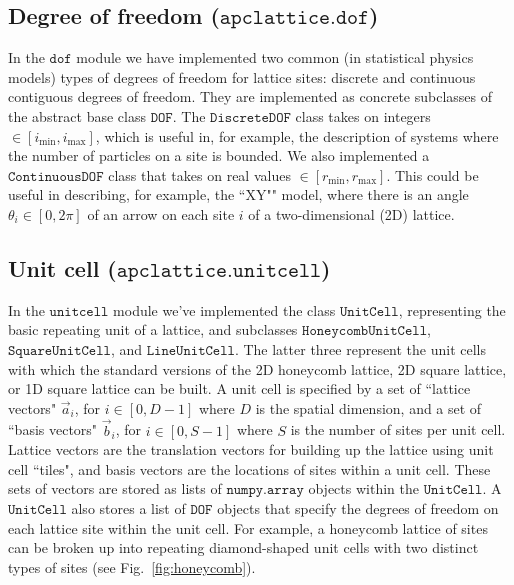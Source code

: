 \documentclass{article}
\begin{document}
\subsection{Degree of freedom ($\texttt{apclattice.dof}$)}
In the $\texttt{dof}$ module we have implemented two common (in statistical physics models) types of degrees of freedom for lattice sites: discrete and continuous contiguous degrees of freedom. They are implemented as concrete subclasses of the abstract base class $\texttt{DOF}$. The $\texttt{DiscreteDOF}$ class takes on integers $\in [i_\mathrm{min}, i_\mathrm{max}]$, which is useful in, for example, the description of systems where the number of particles on a site is bounded. We also implemented a $\texttt{ContinuousDOF}$ class that takes on real values $\in [r_\mathrm{min}, r_\mathrm{max}]$. This could be useful in describing, for example, the ``XY"" model, where there is an angle $\theta_i \in [0, 2 \pi]$ of an arrow on each site $i$ of a two-dimensional (2D) lattice.

\subsection{Unit cell ($\texttt{apclattice.unitcell}$)}
In the $\texttt{unitcell}$ module we've implemented the class $\texttt{UnitCell}$, representing the basic repeating unit of a lattice, and subclasses $\texttt{HoneycombUnitCell}$, $\texttt{SquareUnitCell}$, and $\texttt{LineUnitCell}$. The latter three represent the unit cells with which the standard versions of the 2D honeycomb lattice, 2D square lattice, or 1D square lattice can be built. A unit cell is specified by a set of ``lattice vectors" $\vec{a}_i$, for $i\in [0, D-1]$ where $D$ is the spatial dimension, and a set of ``basis vectors" $\vec{b}_i$, for $i \in [0, S-1]$ where $S$ is the number of sites per unit cell. Lattice vectors are the translation vectors for building up the lattice using unit cell ``tiles", and basis vectors are the locations of sites within a unit cell. These sets of vectors are stored as lists of $\texttt{numpy.array}$ objects within the $\texttt{UnitCell}$. A $\texttt{UnitCell}$ also stores a list of $\texttt{DOF}$ objects that specify the degrees of freedom on each lattice site within the unit cell.  For example, a honeycomb lattice of sites can be broken up into repeating diamond-shaped unit cells with two distinct types of sites (see Fig.~\ref{fig:honeycomb}).
\end{document}

